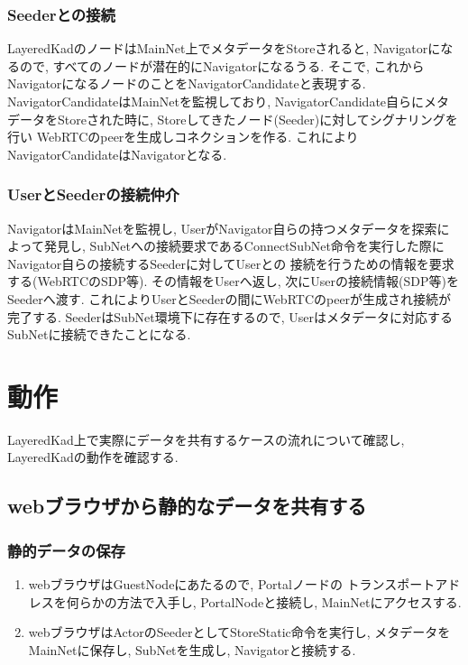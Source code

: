 \documentclass[sotsuron]{jcsie}
\begin{document}
\subsubsection{Seederとの接続}
LayeredKadのノードはMainNet上でメタデータをStoreされると, 
Navigatorになるので, すべてのノードが潜在的にNavigatorになるうる.
そこで, これからNavigatorになるノードのことをNavigatorCandidateと表現する.
NavigatorCandidateはMainNetを監視しており, 
NavigatorCandidate自らにメタデータをStoreされた時に, 
Storeしてきたノード(Seeder)に対してシグナリングを行い
WebRTCのpeerを生成しコネクションを作る.
これによりNavigatorCandidateはNavigatorとなる.

\subsubsection{UserとSeederの接続仲介}
NavigatorはMainNetを監視し, 
UserがNavigator自らの持つメタデータを探索によって発見し, 
SubNetへの接続要求であるConnectSubNet命令を実行した際に
Navigator自らの接続するSeederに対してUserとの
接続を行うための情報を要求する(WebRTCのSDP等).
その情報をUserへ返し, 次にUserの接続情報(SDP等)をSeederへ渡す.
これによりUserとSeederの間にWebRTCのpeerが生成され接続が完了する.
SeederはSubNet環境下に存在するので, 
Userはメタデータに対応するSubNetに接続できたことになる.

\section{動作}
LayeredKad上で実際にデータを共有するケースの流れについて確認し, 
LayeredKadの動作を確認する.

\subsection{webブラウザから静的なデータを共有する}
\subsubsection{静的データの保存}
\begin{enumerate}
	\item 
	      webブラウザはGuestNodeにあたるので, Portalノードの
	      トランスポートアドレスを何らかの方法で入手し, PortalNodeと接続し, 
	      MainNetにアクセスする.
	      \\
	\item
	      webブラウザはActorのSeederとしてStoreStatic命令を実行し, 
	      メタデータをMainNetに保存し, SubNetを生成し, Navigatorと接続する.
\end{enumerate}
\end{document}
